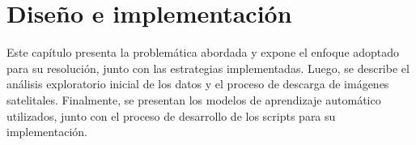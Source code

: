\chapter{Diseño e implementación} %

\label{Chapter3} %

Este capítulo presenta la problemática abordada y expone el enfoque adoptado para su resolución, junto con las estrategias implementadas. Luego, se describe 
el análisis exploratorio inicial de los datos y el proceso de descarga de imágenes satelitales. 
Finalmente, se presentan los modelos de aprendizaje automático utilizados, junto con el proceso 
de desarrollo de los scripts para su implementación.

